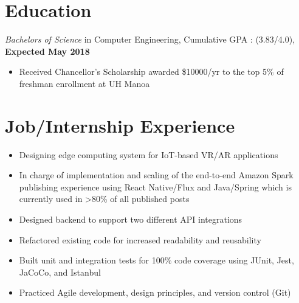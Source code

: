 \documentclass{resume}
\begin{document}
\raggedbottom
{}

\section{%
Education}
\textit{Bachelors of Science} in Computer Engineering, Cumulative GPA : (3.83/4.0), \textbf{Expected May 2018}
\begin{itemize}[noitemsep,nolistsep]
  \item Received Chancellor's Scholarship awarded \$10000/yr to the top 5\% of freshman enrollment at UH Manoa
\end{itemize}
\section{%
 Job/Internship Experience}

 \begin{itemize}[noitemsep,nolistsep]
   \item Designing edge computing system for IoT-based VR/AR applications
 \end{itemize}

 \begin{itemize}[noitemsep,nolistsep]
   \item In charge of implementation and scaling of the end-to-end Amazon Spark publishing experience using React Native/Flux and Java/Spring
   which is currently used in >80\% of all published posts
   \item Designed backend to support two different API integrations
   \item Refactored existing code for increased readability and reusability
   \item Built unit and integration tests for 100\% code coverage using JUnit, Jest, JaCoCo, and Istanbul
   \item Practiced Agile development, design principles, and version control (Git)
 \end{itemize}
\end{document}
